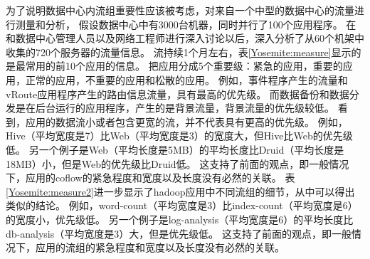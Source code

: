  
为了说明数据中心内流组重要性应该被考虑，对来自一个中型的数据中心的流量进行测量和分析，
假设数据中心中有3000台机器，同时并行了100个应用程序。
在和数据中心管理人员以及网络工程师进行深入讨论以后，深入分析了从60个机架中收集的720个服务器的流量信息。
流持续1个月左右，表\ref{Yosemite:measure}显示的是最常用的前10个应用的信息。
把应用分成5个重要级：紧急的应用，重要的应用，正常的应用，不重要的应用和松散的应用。
例如，事件程序产生的流量和vRoute应用程序产生的路由信息流量，具有最高的优先级。
而数据备份和数据分发是在后台运行的应用程序，产生的是背景流量，背景流量的优先级较低。
看到，应用的数据流小或者包含更宽的流，并不代表具有更高的优先级。
例如，Hive（平均宽度是7）比Web（平均宽度是3）的宽度大，但Hive比Web的优先级低。
另一个例子是Web（平均长度是5MB）的平均长度比Druid（平均长度是18MB）小，但是Web的优先级比Druid低。
这支持了前面的观点，即一般情况下，应用的coflow的紧急程度和宽度以及长度没有必然的关联。
表\ref{Yosemite:measure2}进一步显示了hadoop应用中不同流组的细节，从中可以得出类似的结论。
例如，word-count（平均宽度是3）比index-count（平均宽度是6）的宽度小，优先级低。
另一个例子是log-analysis（平均宽度是6）的平均长度比db-analysis（平均宽度是3）大，但是优先级低。
这支持了前面的观点，即一般情况下，应用的流组的紧急程度和宽度以及长度没有必然的关联。
